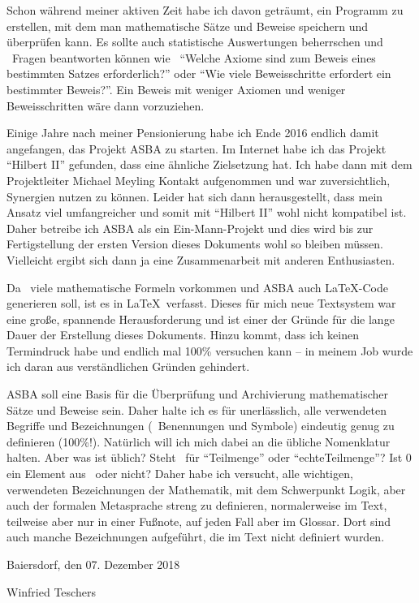 Schon während meiner aktiven Zeit habe ich davon geträumt, ein Programm zu erstellen, mit dem man mathematische Sätze und Beweise speichern und überprüfen kann.
Es sollte auch statistische Auswertungen beherrschen und \textua\ Fragen beantworten können wie \textzB\
"`Welche Axiome sind zum Beweis eines bestimmten Satzes erforderlich?"' oder
"`Wie viele Beweisschritte erfordert ein bestimmter Beweis?"'.
Ein Beweis mit weniger Axiomen und weniger Beweisschritten wäre dann vorzuziehen.

Einige Jahre nach meiner Pensionierung habe ich Ende 2016 endlich damit angefangen, das Projekt ASBA zu starten.
Im Internet habe ich das Projekt "`Hilbert II"' \cite{bib:HilbertII} gefunden, dass eine ähnliche Zielsetzung hat.
Ich habe dann mit dem Projektleiter Michael Meyling Kontakt aufgenommen und war zuversichtlich, Synergien nutzen zu können.
Leider hat sich dann herausgestellt, dass mein Ansatz viel umfangreicher und somit mit "`Hilbert II"' wohl nicht kompatibel ist.
Daher betreibe ich ASBA als ein Ein-Mann-Projekt und dies wird bis zur Fertigstellung der ersten Version dieses Dokuments wohl so bleiben müssen.
Vielleicht ergibt sich dann ja eine Zusammenarbeit mit anderen Enthusiasten.

Da \hier\ viele mathematische Formeln vorkommen und ASBA auch \LaTeX-Code generieren soll, ist es in \LaTeX\ verfasst.
Dieses für mich neue Textsystem war eine große, spannende Herausforderung und ist einer der Gründe für die lange Dauer der Erstellung dieses Dokuments.
Hinzu kommt, dass ich keinen Termindruck habe und endlich mal 100\% versuchen kann -- in meinem Job wurde ich daran aus verständlichen Gründen gehindert.

ASBA soll eine Basis für die Überprüfung und Archivierung mathematischer Sätze und Beweise sein.
Daher halte ich es für unerlässlich, alle verwendeten Begriffe und Bezeichnungen (\textdh\ Benennungen und Symbole) eindeutig genug zu definieren (100\%!).
Natürlich will ich mich dabei an die übliche Nomenklatur halten.
Aber was ist üblich?
Steht \MtsSubset\ für "`Teilmenge"' oder "`echteTeilmenge"'?
Ist $0$ ein Element aus \MtsIN\ oder nicht?
Daher habe ich versucht, alle wichtigen, verwendeten Bezeichnungen der Mathematik, mit dem Schwerpunkt Logik, aber auch der formalen Metasprache streng zu definieren, normalerweise im Text, teilweise aber nur in einer Fußnote, auf jeden Fall aber im Glossar.
Dort sind auch manche Bezeichnungen aufgeführt, die im Text nicht definiert wurden.

\bigskip

Baiersdorf, den 07. Dezember 2018

Winfried Teschers

\Endchapter
